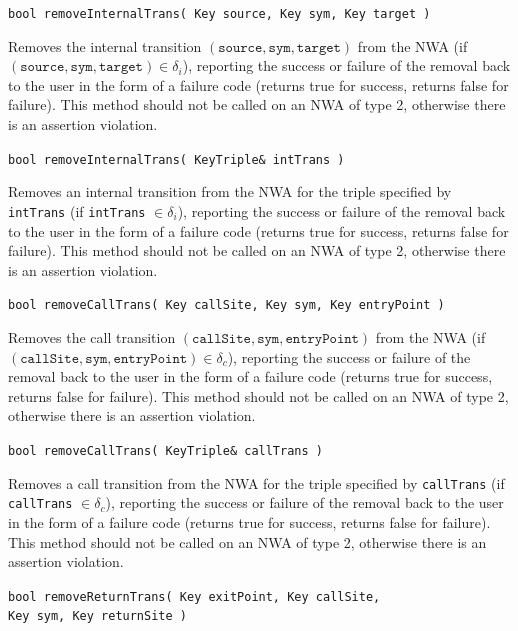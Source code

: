 \documentclass{llncs}
\begin{document}
\begin{description}

  \item\texttt{bool removeInternalTrans( Key source, Key sym, Key target )}

    Removes the internal transition $(\texttt{source},\texttt{sym},\texttt{target})$ from the NWA (if $(\texttt{source},\texttt{sym},\texttt{target}) \in \delta_i$), reporting the success or failure of the removal back to the user in the form of a failure code (returns true for success, returns false for failure).  This method should not be called on an NWA of type 2, otherwise there is an assertion violation.

  \item\texttt{bool removeInternalTrans( KeyTriple\& intTrans )}

    Removes an internal transition from the NWA for the triple specified by \texttt{intTrans} (if \texttt{intTrans} $\in \delta_i$), reporting the success or failure of the removal back to the user in the form of a failure code (returns true for success, returns false for failure).  This method should not be called on an NWA of type 2, otherwise there is an assertion violation.

  \item\texttt{bool removeCallTrans( Key callSite, Key sym, Key entryPoint )}

    Removes the call transition $(\texttt{callSite},\texttt{sym},\texttt{entryPoint})$ from the NWA (if $(\texttt{callSite},\texttt{sym},\texttt{entryPoint}) \in \delta_c$), reporting the success or failure of the removal back to the user in the form of a failure code (returns true for success, returns false for failure).  This method should not be called on an NWA of type 2, otherwise there is an assertion violation. 
 
  \item\texttt{bool removeCallTrans( KeyTriple\& callTrans )}

    Removes a call transition from the NWA for the triple specified by \texttt{callTrans} (if \texttt{callTrans} $\in \delta_c$), reporting the success or failure of the removal back to the user in the form of a failure code (returns true for success, returns false for failure).  This method should not be called on an NWA of type 2, otherwise there is an assertion violation.

  \item\texttt{bool removeReturnTrans( Key exitPoint, Key callSite,\\ \hspace*{3.25cm} Key sym, Key returnSite )}


\end{description}
\end{document}
